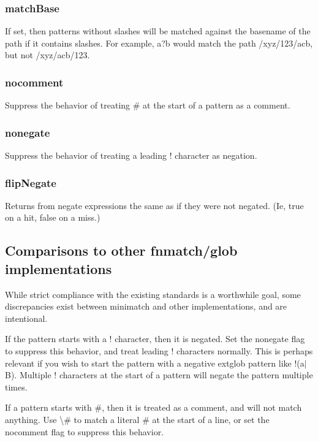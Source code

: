 \subsubsection*{match\+Base}

If set, then patterns without slashes will be matched against the basename of the path if it contains slashes. For example, {\ttfamily a?b} would match the path {\ttfamily /xyz/123/acb}, but not {\ttfamily /xyz/acb/123}.

\subsubsection*{nocomment}

Suppress the behavior of treating {\ttfamily \#} at the start of a pattern as a comment.

\subsubsection*{nonegate}

Suppress the behavior of treating a leading {\ttfamily !} character as negation.

\subsubsection*{flip\+Negate}

Returns from negate expressions the same as if they were not negated. (Ie, true on a hit, false on a miss.)

\subsection*{Comparisons to other fnmatch/glob implementations}

While strict compliance with the existing standards is a worthwhile goal, some discrepancies exist between minimatch and other implementations, and are intentional.

If the pattern starts with a {\ttfamily !} character, then it is negated. Set the {\ttfamily nonegate} flag to suppress this behavior, and treat leading {\ttfamily !} characters normally. This is perhaps relevant if you wish to start the pattern with a negative extglob pattern like {\ttfamily !(a$\vert$B)}. Multiple {\ttfamily !} characters at the start of a pattern will negate the pattern multiple times.

If a pattern starts with {\ttfamily \#}, then it is treated as a comment, and will not match anything. Use {\ttfamily \textbackslash{}\#} to match a literal {\ttfamily \#} at the start of a line, or set the {\ttfamily nocomment} flag to suppress this behavior.

